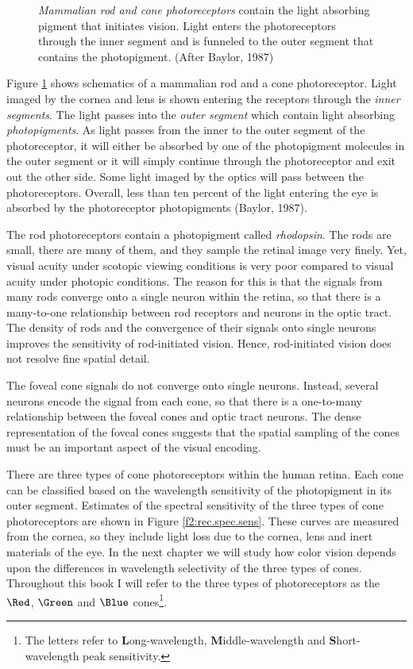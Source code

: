 \begin{figure}
\centerline{
}
\caption[Schematic of Rods and Cones]{
{\em Mammalian rod and cone photoreceptors} contain the light
absorbing pigment that initiates vision.
Light enters the photoreceptors through the inner segment and is
funneled to the outer segment that contains the photopigment.
(After Baylor, 1987) %
}
\label{f2:photoreceptor}
\end{figure}
Figure \ref{f2:photoreceptor}
shows schematics of a mammalian rod and a cone photoreceptor.
Light imaged by the cornea and lens
is shown entering the receptors through the {\em inner segments}.
The light passes into the {\em outer segment}
which contain light absorbing {\em photopigments}.
As light passes from the inner to the
outer segment of the photoreceptor,
it will either be absorbed by one of the photopigment
molecules in the outer segment or it
will simply continue through the photoreceptor and
exit out the other side.
Some light imaged by the optics will pass between the
photoreceptors.
Overall, less than ten percent of the light entering the eye
is absorbed by the photoreceptor photopigments (Baylor, 1987).
\nocite{BaylorProctor}

The rod photoreceptors contain a photopigment called
{\em rhodopsin}.
The rods are small, there are many
of them, and they sample the retinal image very finely.
Yet, visual acuity under scotopic viewing conditions is very poor
compared to visual acuity under photopic conditions.
The reason for this is that the signals from many rods
converge onto a single neuron within the
retina, so that there is a many-to-one relationship between rod
receptors and neurons in the optic tract.
The density of rods and the convergence of their
signals onto single neurons improves the
sensitivity of rod-initiated vision.
Hence, rod-initiated vision does not resolve fine spatial detail.

The foveal cone signals do not converge onto single neurons.
Instead, several neurons encode the
signal from each cone, so that 
there is a one-to-many relationship between the foveal cones
and optic tract neurons.
The dense representation of the foveal cones
suggests that the spatial sampling of the
cones must be an important aspect of the visual encoding.

There are three types of cone photoreceptors
within the human retina.
Each cone can be classified based on
the wavelength sensitivity of
the photopigment in its outer segment.
Estimates of the spectral sensitivity of the three types of
cone photoreceptors
are shown in Figure \ref{f2:rec.spec.sens}.
These curves are measured from the cornea, so they include
light loss due to the cornea, lens and inert materials of the eye.
In the next chapter we will study how color vision depends
upon the differences in wavelength selectivity of the three
types of cones.
Throughout this book I will
refer to the three types of photoreceptors
as the $\Red$, $\Green$ and $\Blue$ cones\footnote{
The letters refer to {\bf L}ong-wavelength, {\bf M}iddle-wavelength
and {\bf S}hort-wavelength peak sensitivity.
}.

